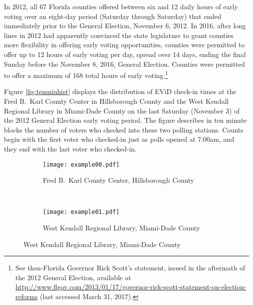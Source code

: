 \documentclass[12pt,titlepage]{article}
\begin{document}






In 2012, all 67 Florida counties offered between six and 12 daily
hours of early voting over an eight-day period (Saturday through
Saturday) that ended immediately prior to the General Election,
November 6, 2012.  In 2016, after long lines in 2012 had apparently
convinced the state legislature to grant counties more flexibility in
offering early voting opportunities, counties were permitted to offer
up to 12 hours of early voting per day, spread over 14 days, ending
the final Sunday before the November 8, 2016, General Election.
Counties were permitted to offer a maximum of 168 total hours of early
voting.\footnote{See then-Florida Governor Rick Scott's statement,
  issued in the aftermath of the 2012 General Election, available at
  \url{http://www.flgov.com/2013/01/17/governor-rick-scott-statement-on-election-reforms}
  (last accessed March 31, 2017).}

Figure \ref{fig:tenminhist} displays the distribution of EViD check-in
times at the Fred B.\ Karl County Center in Hillsborough County and
the West Kendall Regional Library in Miami-Dade County on the last
Saturday (November 3) of the 2012 General Election early voting
period. The figure describes in ten minute blocks the number of voters
who checked into these two polling stations. Counts begin with the
first voter who checked-in just as polls opened at 7:00am, and they
end with the last voter who checked-in.

\begin{figure}[!ht]
  \caption{Early voting check-in times on Saturday, November 3, 2012,
    in two locations}
  \label{fig:tenminhist}
  \centering
  \begin{subfigure}[b]{\linewidth}
    \centering\texttt{[image: example00.pdf]}
    \caption{Fred B.\ Karl County Center, Hillsborough County}
    \label{fig:karlexample}
  \end{subfigure}%
  \\
  \begin{subfigure}[b]{\linewidth}
    \centering\texttt{[image: example01.pdf]}
    \caption{West Kendall Regional Library, Miami-Dade County}
    \label{fig:kendallexample}
  \end{subfigure}
\end{figure}
\end{document}
